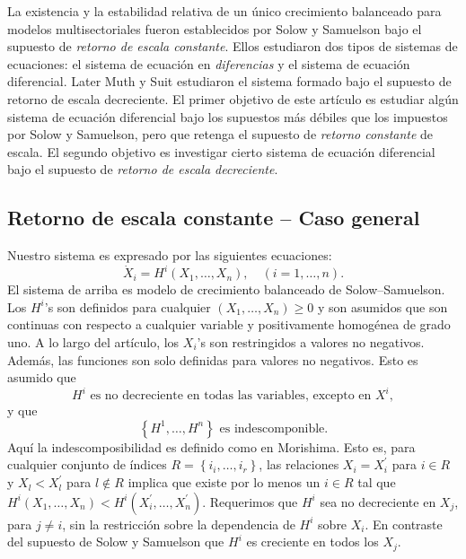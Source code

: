 La existencia y la estabilidad relativa de un único crecimiento balanceado para modelos multisectoriales fueron establecidos por Solow y Samuelson bajo el supuesto de \emph{retorno de escala constante}. Ellos estudiaron dos tipos de sistemas de ecuaciones: el sistema de ecuación en \emph{diferencias} y el sistema de ecuación diferencial. Later Muth y Suit estudiaron el sistema formado bajo el supuesto de retorno de escala decreciente. El primer objetivo de este artículo es estudiar algún sistema de ecuación diferencial bajo los supuestos más débiles que los impuestos por Solow y Samuelson, pero que retenga el supuesto de \emph{retorno constante} de escala. El segundo objetivo es investigar cierto sistema de ecuación diferencial bajo el supuesto de \emph{retorno de escala decreciente}.

\subsection{Retorno de escala constante -- Caso general}
Nuestro sistema es expresado por las siguientes ecuaciones:
\begin{equation}
\dot{X}_{i}=H^{i}\left(X_{1},\ldots,X_{n}\right),\quad\left(i=1,\ldots,n\right).
\end{equation}
El sistema de arriba es modelo de crecimiento balanceado de Solow--Samuelson. Los $H^i$'s son definidos para cualquier $\left(X_{1},\ldots,X_{n}\right)\geq0$ y son asumidos que son continuas con respecto a cualquier variable y positivamente homogénea de grado uno. A lo largo del artículo, los $X_{i}$'s son restringidos a valores no negativos. Además, las funciones son solo definidas para valores no negativos. Esto es asumido que
\begin{equation}
H^{i}\text{ es no decreciente en todas las variables, excepto en }X^{i},
\end{equation}
y que
\begin{equation}
\left\{H^{1},\ldots,H^{n}\right\}\text{ es indescomponible}.
\end{equation}
Aquí la indescomposibilidad es definido como en Morishima. Esto es, para cualquier conjunto de índices $R=\left\{i_{i},\ldots,i_{r}\right\}$, las relaciones $X_{i}=X^{\prime}_{i}$ para $i\in R$ y $X_{l}<X^{\prime}_{l}$ para $l\notin R$ implica que existe por lo menos un $i\in R$ tal que $H^{i}\left(X_{1},\ldots,X_{n}\right)<H^{i}\left(X^{\prime}_{i},\ldots,X^{\prime}_{n}\right)$. Requerimos que $H^{i}$ sea no decreciente en $X_{j}$, para $j\neq i$, sin la restricción sobre la dependencia de $H^{i}$ sobre $X_{i}$. En contraste del supuesto de Solow y Samuelson que $H^{i}$ es creciente en todos los $X_{j}$.


